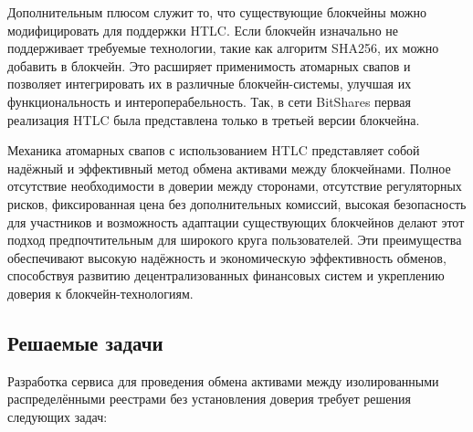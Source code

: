 Дополнительным плюсом служит то, что существующие блокчейны можно модифицировать для поддержки HTLC. Если блокчейн изначально не поддерживает требуемые технологии, такие как алгоритм SHA256, их можно добавить в блокчейн. Это расширяет применимость атомарных свапов и позволяет интегрировать их в различные блокчейн-системы, улучшая их функциональность и интероперабельность. Так, в сети BitShares первая реализация HTLC была представлена только в третьей версии блокчейна\cite{label28}.

Механика атомарных свапов с использованием HTLC представляет собой надёжный и эффективный метод обмена активами между блокчейнами. Полное отсутствие необходимости в доверии между сторонами, отсутствие регуляторных рисков, фиксированная цена без дополнительных комиссий, высокая безопасность для участников и возможность адаптации существующих блокчейнов делают этот подход предпочтительным для широкого круга пользователей. Эти преимущества обеспечивают высокую надёжность и экономическую эффективность обменов, способствуя развитию децентрализованных финансовых систем и укреплению доверия к блокчейн-технологиям.

\subsection{Решаемые задачи}

Разработка сервиса для проведения обмена активами между изолированными распределёнными реестрами без установления доверия требует решения следующих задач:

